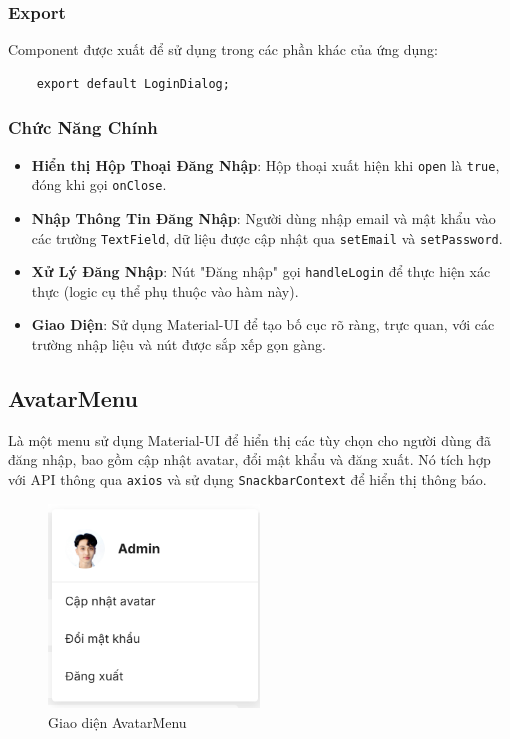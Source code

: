             \subsubsection{Export}
                \hspace*{0.6cm}Component được xuất để sử dụng trong các phần khác của ứng dụng:
                \begin{lstlisting}
    export default LoginDialog;
                \end{lstlisting}
            \subsubsection{Chức Năng Chính}
                \begin{itemize}
                    \item \textbf{Hiển thị Hộp Thoại Đăng Nhập}: Hộp thoại xuất hiện khi \texttt{open} là \texttt{true}, đóng khi gọi \texttt{onClose}.
                    \item \textbf{Nhập Thông Tin Đăng Nhập}: Người dùng nhập email và mật khẩu vào các trường \texttt{TextField}, dữ liệu được cập nhật qua \texttt{setEmail} và \texttt{setPassword}.
                    \item \textbf{Xử Lý Đăng Nhập}: Nút "Đăng nhập" gọi \texttt{handleLogin} để thực hiện xác thực (logic cụ thể phụ thuộc vào hàm này).
                    \item \textbf{Giao Diện}: Sử dụng Material-UI để tạo bố cục rõ ràng, trực quan, với các trường nhập liệu và nút được sắp xếp gọn gàng.
                \end{itemize}
        \subsection{AvatarMenu}
            \hspace*{0.6cm}Là một menu sử dụng Material-UI để hiển thị các tùy chọn cho người dùng đã đăng nhập, bao gồm cập nhật avatar, đổi mật khẩu và đăng xuất. Nó tích hợp với API thông qua \texttt{axios} và sử dụng \texttt{SnackbarContext} để hiển thị thông báo.
            \begin{figure}[H]
                \centering
                \includegraphics[width=0.5\textwidth]{pictures/AvatarMenu.png}
                \caption{Giao diện AvatarMenu}
                \label{fig:avatar}
            \end{figure}
